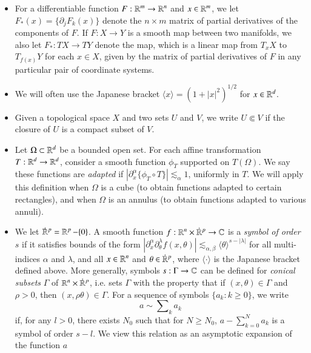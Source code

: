 \begin{itemize}
    \item For a differentiable function $F: \operatorname{\mathbb{R}}^m \to \operatorname{\mathbb{R}}^n$ and $x \in \operatorname{\mathbb{R}}^m$, we let $F_{\!*}(x) = \{ \partial_j F_k(x) \}$ denote the $n \times m$ matrix of partial derivatives of the components of $F$. If $F: X \to Y$ is a smooth map between two manifolds, we also let $F_*: TX \to TY$ denote the map, which is a linear map from $T_x X$ to $T_{f(x)} Y$ for each $x \in X$, given by the matrix of partial derivatives of $F$ in any particular pair of coordinate systems.

    \item We will often use the Japanese bracket $\langle x \rangle = (1 + |x|^2)^{1/2}$ for $x \in \operatorname{\mathbb{R}}^d$.

    \item Given a topological space $X$ and two sets $U$ and $V$, we write $U \Subset V$ if the closure of $U$ is a compact subset of $V$.

    \item Let $\Omega \subset \operatorname{\mathbb{R}}^d$ be a bounded open set. For each affine transformation $T: \operatorname{\mathbb{R}}^d \to \operatorname{\mathbb{R}}^d$, consider a smooth function $\phi_T$ supported on $T(\Omega)$. We say these functions are \emph{adapted} if $|\partial_x^\alpha \{ \phi_T \circ T \}| \lesssim_\alpha 1$, uniformly in $T$. We will apply this definition when $\Omega$ is a cube (to obtain functions adapted to certain rectangles), and when $\Omega$ is an annulus (to obtain functions adapted to various annuli).

    \item We let ${\dot{\RR}{\vphantom{\RR}}^p} = \RR^p - \{ 0 \}$. A smooth function $f: {\RR^n} \times {\dot{\RR}{\vphantom{\RR}}^p} \to \CC$ is a \emph{symbol of order $s$} if it satisfies bounds of the form $| \partial_x^\alpha \partial_\theta^\lambda f (x,\theta) | \lesssim_{\alpha,\beta} \langle \theta \rangle^{s - |\lambda|}$ for all multi-indices $\alpha$ and $\lambda$, and all $x \in \operatorname{\mathbb{R}}^n$ and $\theta \in {\dot{\RR}{\vphantom{\RR}}^p}$, where $\langle \cdot \rangle$ is the Japanese bracket defined above. More generally, symbols $s: \Gamma \to \operatorname{\mathbb{C}}$ can be defined for \emph{conical subsets} $\Gamma$ of ${\RR^n} \times {\dot{\RR}{\vphantom{\RR}}^p}$, i.e. sets $\Gamma$ with the property that if $(x,\theta) \in \Gamma$ and $\rho > 0$, then $(x,\rho \theta) \in \Gamma$. For a sequence of symbols $\{ a_k : k \geq 0 \}$, we write
    \[ a \sim \sum\nolimits_k a_k \]
    if, for any $l > 0$, there exists $N_0$ such that for $N \geq N_0$, $a - \sum_{k = 0}^N a_k$ is a symbol of order $s - l$. We view this relation as an asymptotic expansion of the function $a$


\end{itemize}
